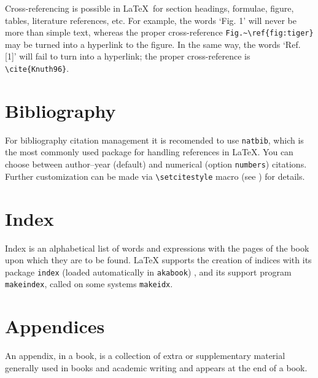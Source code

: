 \documentclass{ltxdoc}
\def\file#1{\texttt{#1}}
\begin{document}
Cross-referencing is possible in \LaTeX\ for section headings, formulae, figure, tables, 
literature references, etc. For example, the words `Fig. 1' will never be more than simple 
text, whereas the proper cross-reference \verb!Fig.~\ref{fig:tiger}! may be turned into a 
hyperlink to the figure. In the same way, the words `Ref. [1]' will fail to turn into a 
hyperlink; the proper cross-reference is \verb!\cite{Knuth96}!.


\section{Bibliography}

For bibliography citation management it is recomended to use \file{natbib},
which 
is the most commonly used package for handling references in LaTeX.
You can choose between author--year (default) and numerical (option \verb!numbers!) citations.
Further customization 
can be made via \verb!\setcitestyle! macro (see \cite{ref:natbib}) for details.

\section{Index}

Index is an alphabetical list of words and 
expressions with the pages of the book upon which they are to be found. 
LaTeX supports the creation of indices with its package \file{index} (loaded automatically in \file{akabook}) \cite{ref:index}, 
and its support program \file{makeindex}, called on some systems \file{makeidx}.

\section{Appendices}

An appendix, in a book, is a collection of extra or supplementary material 
generally used in books and academic writing and appears at the end of a book.
 
\end{document}
